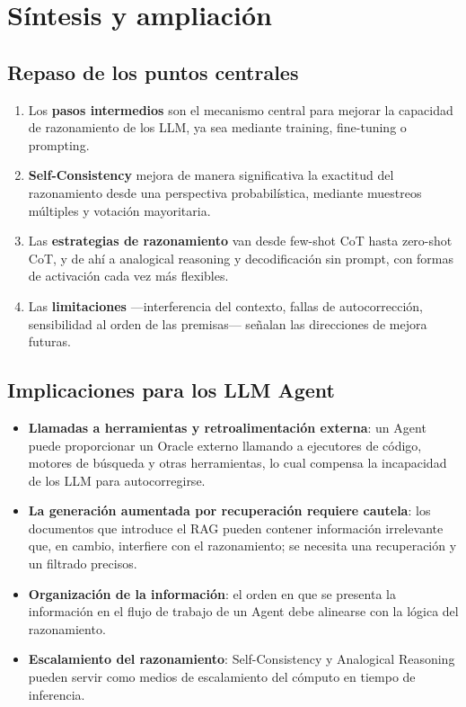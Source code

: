 \documentclass[a4paper]{article}
\begin{document}
\section{Síntesis y ampliación}

\subsection{Repaso de los puntos centrales}

\begin{enumerate}
    \item Los \textbf{pasos intermedios} son el mecanismo central para mejorar la capacidad de razonamiento de los LLM, ya sea mediante training, fine-tuning o prompting.
    \item \textbf{Self-Consistency} mejora de manera significativa la exactitud del razonamiento desde una perspectiva probabilística, mediante muestreos múltiples y votación mayoritaria.
    \item Las \textbf{estrategias de razonamiento} van desde few-shot CoT hasta zero-shot CoT, y de ahí a analogical reasoning y decodificación sin prompt, con formas de activación cada vez más flexibles.
    \item Las \textbf{limitaciones} —interferencia del contexto, fallas de autocorrección, sensibilidad al orden de las premisas— señalan las direcciones de mejora futuras.
\end{enumerate}

\subsection{Implicaciones para los LLM Agent}

\begin{itemize}
    \item \textbf{Llamadas a herramientas y retroalimentación externa}: un Agent puede proporcionar un Oracle externo llamando a ejecutores de código, motores de búsqueda y otras herramientas, lo cual compensa la incapacidad de los LLM para autocorregirse.
    \item \textbf{La generación aumentada por recuperación requiere cautela}: los documentos que introduce el RAG pueden contener información irrelevante que, en cambio, interfiere con el razonamiento; se necesita una recuperación y un filtrado precisos.
    \item \textbf{Organización de la información}: el orden en que se presenta la información en el flujo de trabajo de un Agent debe alinearse con la lógica del razonamiento.
    \item \textbf{Escalamiento del razonamiento}: Self-Consistency y Analogical Reasoning pueden servir como medios de escalamiento del cómputo en tiempo de inferencia.
\end{itemize}
\end{document}
